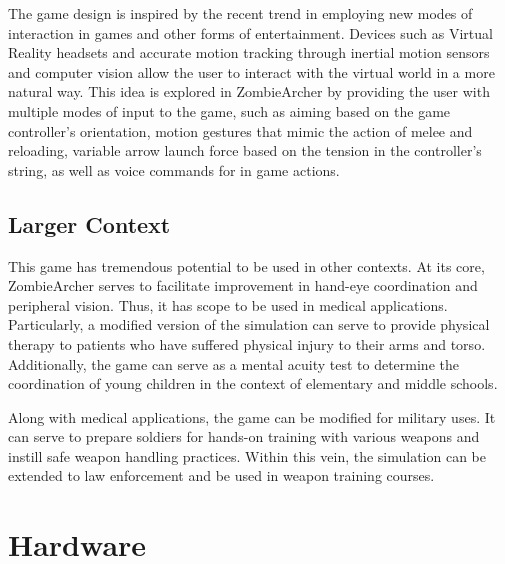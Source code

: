 \documentclass[titlepage, 12pt]{scrartcl}
\begin{document}
        \par
        The game design is inspired by the recent trend in employing new modes of interaction in games and other forms of entertainment. Devices such as Virtual Reality headsets and accurate motion tracking through inertial motion sensors and computer vision allow the user to interact with the virtual world in a more natural way. This idea is explored in ZombieArcher by providing the user with multiple modes of input to the game, such as aiming based on the game controller's orientation, motion gestures that mimic the action of melee and reloading, variable arrow launch force based on the tension in the controller's string, as well as voice commands for in game actions.
    \subsection{Larger Context}
        This game has tremendous potential to be used in other contexts. At its core, ZombieArcher serves to facilitate improvement in hand-eye coordination and peripheral vision. Thus, it has scope to be used in medical applications. Particularly, a modified version of the simulation can serve to provide physical therapy to patients who have suffered physical injury to their arms and torso. Additionally, the game can serve as a mental acuity test to determine the coordination of young children in the context of elementary and middle schools. \par
        Along with medical applications, the game can be modified for military uses. It can serve to prepare soldiers for hands-on training with various weapons and instill safe weapon handling practices. Within this vein, the simulation can be extended to law enforcement and be used in weapon training courses.
\section{Hardware} 
\end{document}
